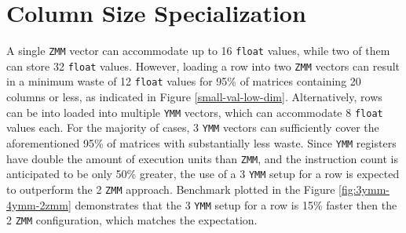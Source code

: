 \documentclass[logo,bsc,singlespacing,parskip]{infthesis}
\newcommand{\dtfloat}{\texttt{float}}
\newcommand{\ymm}{\texttt{YMM}}
\newcommand{\zmm}{\texttt{ZMM}}
\begin{document}




\section{Column Size Specialization}
\label{sec:ColumnSizeSpecialization}

A single \zmm{} vector can accommodate up to 16 \dtfloat{} values, while two of them can store 32 \dtfloat{} values. However, loading a row into two \zmm{} vectors can result in a minimum waste of 12 \dtfloat{} values for 95\% of matrices containing 20 columns or less, as indicated in Figure \ref{small-val-low-dim}. Alternatively, rows can be into loaded into multiple \ymm{} vectors, which can accommodate 8 \dtfloat{} values each. For the majority of cases, 3 \ymm{} vectors can sufficiently cover the aforementioned 95\% of matrices with substantially less waste. Since \ymm{} registers have double the amount of execution units than \zmm{}, and the instruction count is anticipated to be only 50\% greater, the use of a 3 \ymm{} setup for a row is expected to outperform the 2 \zmm{} approach. Benchmark plotted in the Figure \ref{fig:3ymm-4ymm-2zmm} demonstrates that the 3 \ymm{} setup for a row is 15\% faster then the 2 \zmm{} configuration, which matches the expectation.
\end{document}
